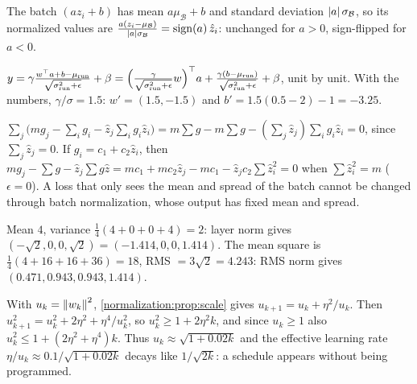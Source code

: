 \section{}

The batch $(az_i + b)$ has mean $a\mu_{\mathcal B} + b$ and standard deviation $\left|a\right|\sigma_{\mathcal B}$, so its normalized values are
$\frac{a(z_i - \mu_{\mathcal B})}{\left|a\right|\sigma_{\mathcal B}} = \operatorname{sign}(a)\,\hat z_i$: unchanged for $a>0$, sign-flipped for $a<0$.

$y = \gamma\frac{w^\top a + b - \mu_{\mathrm{run}}}{\sqrt{\sigma^2_{\mathrm{run}} + \epsilon}} + \beta = \Bigl(\frac\gamma{\sqrt{\sigma^2_{\mathrm{run}} + \epsilon}}w\Bigr)^\top a + \frac{\gamma(b - \mu_{\mathrm{run}})}{\sqrt{\sigma^2_{\mathrm{run}} + \epsilon}} + \beta$, unit by unit. With the
numbers, $\gamma/\sigma = 1.5$: $w' = (1.5, -1.5)$ and $b' = 1.5(0.5 - 2) - 1 = -3.25$.

$\sum_j\bigl(mg_j - \sum_ig_i - \hat z_j\sum_ig_i\hat z_i\bigr) = m\sum g - m\sum g - (\sum_j\hat z_j)\sum_ig_i\hat z_i = 0$, since $\sum_j\hat z_j = 0$. If $g_i = c_1 + c_2\hat z_i$,
then $mg_j - \sum g - \hat z_j\sum g\hat z = mc_1 + mc_2\hat z_j - mc_1 - \hat z_jc_2\sum\hat z_i^2 = 0$ when $\sum\hat z_i^2 = m$ ($\epsilon = 0$). A loss that only
sees the mean and spread of the batch cannot be changed through batch normalization,
whose output has fixed mean and spread.

Mean $4$, variance $\frac14(4 + 0 + 0 + 4) = 2$: layer norm gives $(-\sqrt2, 0, 0, \sqrt2) = (-1.414, 0, 0, 1.414)$. The mean square
is $\frac14(4 + 16 + 16 + 36) = 18$, RMS $= 3\sqrt2 = 4.243$: RMS norm gives $(0.471, 0.943, 0.943, 1.414)$.

With $u_k = \left\|w_k\right\|^2$, \cref{normalization:prop:scale} gives $u_{k+1} = u_k + \eta^2/u_k$. Then
$u_{k+1}^2 = u_k^2 + 2\eta^2 + \eta^4/u_k^2$, so $u_k^2\geq1 + 2\eta^2k$, and since $u_k\geq1$ also $u_k^2\leq1 + (2\eta^2 + \eta^4)k$. Thus $u_k\approx\sqrt{1 + 0.02k}$ and the
effective learning rate $\eta/u_k\approx0.1/\sqrt{1 + 0.02k}$ decays like $1/\sqrt{2k}$: a schedule appears without being
programmed.

\section{}

